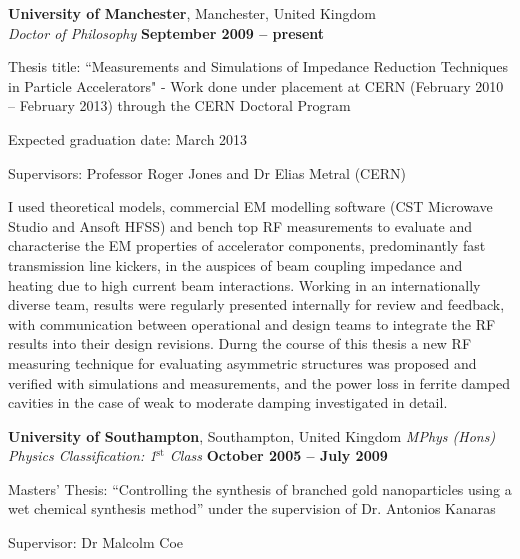 \documentclass[margin,line]{resume}
\begin{document}
\begin{resume}
    \textbf{University of Manchester}, Manchester, United Kingdom \vspace{2mm}\\\vspace{1mm}%
    \textsl{Doctor of Philosophy} \hfill \textbf{ September 2009 -- present}\vspace{-3mm}\\\vspace{-1mm}%
    \begin{list2}
        \item Thesis title: ``Measurements and Simulations of Impedance Reduction Techniques in Particle Accelerators" - Work done under placement at CERN (February 2010 -- February 2013) through the CERN Doctoral Program
        \item Expected graduation date: March 2013
        \item Supervisors:  Professor Roger Jones and Dr Elias Metral (CERN)
        \item I used theoretical models, commercial EM modelling software (CST Microwave Studio and Ansoft HFSS) and bench top RF measurements to evaluate and characterise the EM properties of accelerator components, predominantly fast transmission line kickers, in the auspices of beam coupling impedance and heating due to high current beam interactions. Working in an internationally diverse team, results were regularly presented internally for review and feedback, with communication between operational and design teams to integrate the RF results into their design revisions. Durng the course of this thesis a new RF measuring technique for evaluating asymmetric structures was proposed and verified with simulations and measurements, and the power loss in ferrite damped cavities in the case of weak to moderate damping investigated in detail.
    \end{list2}\vspace{-1.5mm}
    \textbf{ University of Southampton}, Southampton, United Kingdom 
    \textsl{MPhys (Hons) Physics Classification: 1$^{\mathrm{st}}$ Class} \hfill \textbf{October 2005 -- July 2009}\vspace{-3mm}\\\vspace{-1mm}%
    \begin{list2}
        \item Masters' Thesis: ``Controlling the synthesis of branched gold nanoparticles using a wet chemical synthesis method'' under the supervision of Dr. Antonios Kanaras
        \item Supervisor: Dr Malcolm Coe
    \end{list2}\vspace{-1.5mm}


\end{resume}
\end{document}
